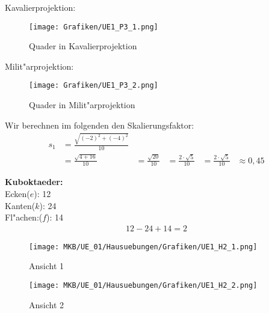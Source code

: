 
\begin{Loesung}
Kavalierprojektion:
\begin{figure}[H]
	\centering
	\texttt{[image: Grafiken/UE1\_P3\_1.png]}
	\caption{Quader in Kavalierprojektion}
	\label{fig:P3_1}
\end{figure}
Milit"arprojektion:
\begin{figure}[H]
	\centering
	\texttt{[image: Grafiken/UE1\_P3\_2.png]}
	\caption{Quader in Milit"arprojektion}
	\label{fig:P3_2}
\end{figure}
\end{Loesung}


\begin{Loesung}
\begin{Teilloesungen}

\item Wir berechnen im folgenden den Skalierungsfaktor:
\begin{align*}
s_1 &= \frac{\sqrt{(-2)^{2}+(-4)^{2}}}{10}\\
&= \frac{\sqrt{4+16}}{10}
&= \frac{\sqrt{20}}{10}
&= \frac{2 \cdot \sqrt{5}}{10}
&= \frac{2 \cdot \sqrt{5}}{10}
&\approx 0,45
\end{align*}

\item \textbf{Kuboktaeder:} \\
Ecken($e$): 12\\
Kanten($k$): 24\\
Fl"achen:($f$): 14\\
\abc %
\begin{align*}
12 - 24 + 14 = 2
\end{align*}

\item \begin{figure}[H]
	\centering
	\texttt{[image: MKB/UE\_01/Hausuebungen/Grafiken/UE1\_H2\_1.png]}
	\caption{Ansicht 1}
	\label{fig:H2_1}
\end{figure}

\begin{figure}[H]
	\centering
	\texttt{[image: MKB/UE\_01/Hausuebungen/Grafiken/UE1\_H2\_2.png]}
	\caption{Ansicht 2}
	\label{fig:H2_2}
\end{figure}

\end{Teilloesungen}
\end{Loesung}
%

